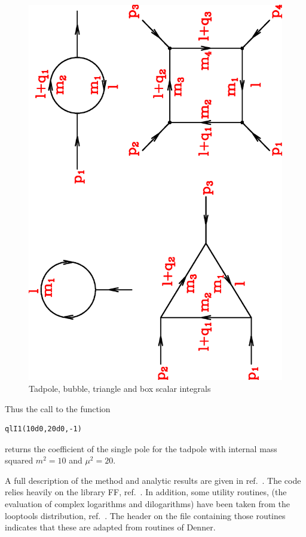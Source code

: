 \documentclass{article}
\begin{document}
\begin{figure}
\includegraphics[angle=270,scale=0.55]{tot}
\caption{Tadpole, bubble, triangle and box scalar integrals}
\label{btbtfig} 
\end{figure}

Thus the call to the function
\begin{verbatim}qlI1(10d0,20d0,-1)\end{verbatim} returns the coefficient
of the single pole for the tadpole with internal mass squared $m^2=10$
and $\mu^2=20$.

A full description of the method and analytic results are given in
ref.~\cite{EZ}.  The code relies heavily on the library FF,
ref.~\cite{van Oldenborgh:1990yc}.  In addition, some utility
routines, (the evaluation of complex logarithms and dilogarithms) have
been taken from the looptools distribution, ref.~\cite{Hahn:1998yk}.
The header on the file containing those routines indicates that these
are adapted from routines of Denner.
\end{document}
